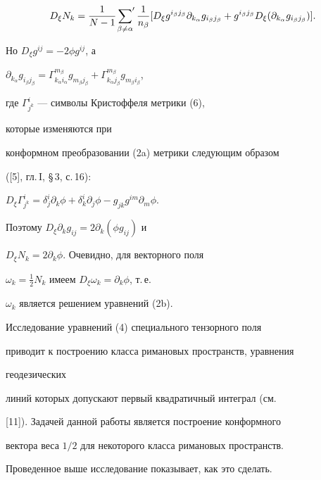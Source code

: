 $$ 


D_\xi N_k=\frac{1}{N-1}\sideset{}{'} 


\sum_{\beta\ne\alpha}\frac{1}{n_\beta} 


[D_\xi g^{i_\beta j_\beta}\partial_{k_\alpha} 


g_{i_\beta j_\beta}+g^{i_\beta j_\beta}D_\xi 


(\partial_{k_\alpha}g_{i_\beta j_\beta})]. 


$$ 


Но $D_\xi g^{ij}=-2\phi g^{ij}$, а 


$\partial_{k_\alpha}g_{i_\beta j_\beta}= 


\Gamma^{m_\beta}_{k_\alpha i_\alpha}g_{m_\beta j_\beta}+ 


\Gamma^{m_\beta}_{k_\alpha j_\beta}g_{m_\beta i_\beta}$, 


где $\Gamma^i_{j^k}$ --- символы Кристоффеля метрики (6),


которые изменяются при 


конформном преобразовании (2a) метрики следующим образом 


([5], гл.\,I, \S\,3, с.\,16): 


$D_\xi\Gamma^i_{j^k}=\delta^i_j 


\partial_k\phi+\delta^i_k\partial_j\phi- 


g_{jk}g^{i m}\partial_m\phi$. 


Поэтому $D_\xi\partial_k g_{ij}=2\partial_k(\phi g_{ij})$ и 


$D_\xi N_k=2\partial_k\phi$. Очевидно, для векторного поля 


$\omega_k=\frac{1}{2}N_k$ имеем $D_\xi\omega_k=\partial_k\phi$, т.\,е.\


$\omega_k$ является решением уравнений (2b). 


 


\begin{note} 


Исследование уравнений (4) специального тензорного поля 


приводит к построению класса римановых пространств, уравнения 


геодезических 


линий которых допускают первый квадратичный интеграл (см.


[11]). Задачей данной работы является построение конформного 


вектора веса $1/2$ для некоторого класса римановых пространств.


Проведенное выше исследование показывает, как это сделать. 


\end{note} 


